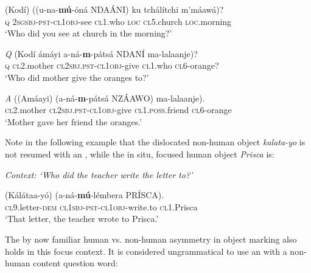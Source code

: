 \documentclass[output=paper]{LSP/langsci}
\begin{document}
\begin{exe}
\ex
\label{02-do-ex:24}
\begin{xlist}

\ex \label{02-do-ex:24a}
\gll (Kodí) 	((u-na-\textbf{mú}-óná 	NDAÁNI) 	ku 	tchálítchi 		m’máawá)?\\
	\textsc{q}	 \textsc{2sgsbj}-\textsc{pst}-\textsc{cl1obj}-see	\textsc{cl1}.who		\textsc{loc}	\textsc{cl5}.church		\textsc{loc}.morning\\
\glt ‘Who did you see at church in the morning?’

\ex \label{02-do-ex:24b}
\gll \emph{Q} (Kodí 	ámáyi		a-ná-\textbf{m}-pátsá		NDANÍ ma-lalaanje)?\\
{ } \textsc{q}	\textsc{cl2}.mother	\textsc{cl2sbj.pst}-\textsc{cl1obj}-give	\textsc{cl1}.who		\textsc{cl6}-orange?\\
\glt ‘Who did mother give the oranges to?’%

\ex \label{02-do-ex:24c}
\gll \emph{A}	((Amáayi) 		(a-ná-\textbf{m}-pátsá					NZÁAWO) 			ma-lalaanje).\\
 { } \textsc{cl2}.mother	\textsc{cl2sbj.pst}-\textsc{cl1obj}-give	\textsc{cl1.poss}.friend	\textsc{cl6}-orange\\
\glt ‘Mother gave her friend the oranges.’%

\end{xlist}
\end{exe}

Note in the following example that the dislocated non-human object \textit{kalata-yo} is not resumed with an , while the in situ, focused human object \textit{Prisca} is:

\begin{exe}
\ex
\label{02-do-ex:26}%

\emph{Context: ‘Who did the teacher write the letter to?’} 

\gll (Kálátaa-yó) 		(a-ná-\textbf{mú}-lémbera 				PRÍSCA).\\
	\textsc{cl9}.letter-\textsc{dem} \textsc{cl1sbj}-\textsc{pst}-\textsc{cl1obj}-write.to	\textsc{cl1}.Prisca\\
\glt ‘That letter, the teacher wrote to Prisca.’
\end{exe}

The by now familiar human vs. non-human asymmetry in object marking also holds in this focus context. It is considered ungrammatical to use an  with a non-human content question word:
\end{document}
